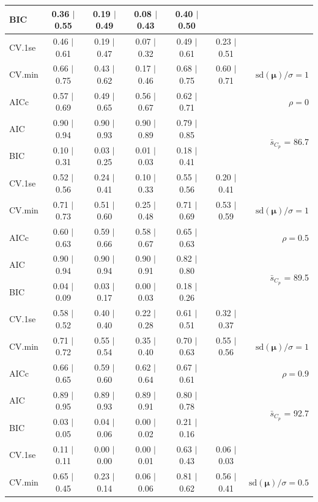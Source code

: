 \documentclass[12pt]{article}
\newcommand{\mr}[1]{\mathrm{#1}}
\newcommand{\bm}[1]{\mathbf{#1}}
\begin{document}
\begin{table}[p]
\begin{center}
\begin{tabular}{l*{5}{c}|r}
BIC & 0.36 $\mid$ 0.55 & 0.19 $\mid$ 0.49 & 0.08 $\mid$ 0.43 & 0.40 $\mid$ 0.50 & & \\
 \hline 
CV.1se & 0.46 $\mid$ 0.61 & 0.19 $\mid$ 0.47 & 0.07 $\mid$ 0.32 & 0.49 $\mid$ 0.61 & 0.23 $\mid$ 0.51 &\\
CV.min & 0.66 $\mid$ 0.75 & 0.43 $\mid$ 0.62 & 0.17 $\mid$ 0.46 & 0.68 $\mid$ 0.75 & 0.60 $\mid$ 0.71 &  $\mr{sd}(\bm{\mu})/\sigma=1$ \\
AICc & 0.57 $\mid$ 0.69 & 0.49 $\mid$ 0.65 & 0.56 $\mid$ 0.67 & 0.62 $\mid$ 0.71 & & $\rho=0$ \\
AIC & 0.90 $\mid$ 0.94 & 0.90 $\mid$ 0.93 & 0.90 $\mid$ 0.89 & 0.79 $\mid$ 0.85 & & \multirow{2}{*}{$\bar{s}_{C_p}$ = 86.7} \\
BIC & 0.10 $\mid$ 0.31 & 0.03 $\mid$ 0.25 & 0.01 $\mid$ 0.03 & 0.18 $\mid$ 0.41 & & \\
 \hline 
CV.1se & 0.52 $\mid$ 0.56 & 0.24 $\mid$ 0.41 & 0.10 $\mid$ 0.33 & 0.55 $\mid$ 0.56 & 0.20 $\mid$ 0.41 &\\
CV.min & 0.71 $\mid$ 0.73 & 0.51 $\mid$ 0.60 & 0.25 $\mid$ 0.48 & 0.71 $\mid$ 0.69 & 0.53 $\mid$ 0.59 &  $\mr{sd}(\bm{\mu})/\sigma=1$ \\
AICc & 0.60 $\mid$ 0.63 & 0.59 $\mid$ 0.66 & 0.58 $\mid$ 0.67 & 0.65 $\mid$ 0.63 & & $\rho=0.5$ \\
AIC & 0.90 $\mid$ 0.94 & 0.90 $\mid$ 0.94 & 0.90 $\mid$ 0.91 & 0.82 $\mid$ 0.80 & & \multirow{2}{*}{$\bar{s}_{C_p}$ = 89.5} \\
BIC & 0.04 $\mid$ 0.09 & 0.03 $\mid$ 0.17 & 0.00 $\mid$ 0.03 & 0.18 $\mid$ 0.26 & & \\
 \hline 
CV.1se & 0.58 $\mid$ 0.52 & 0.40 $\mid$ 0.40 & 0.22 $\mid$ 0.28 & 0.61 $\mid$ 0.51 & 0.32 $\mid$ 0.37 &\\
CV.min & 0.71 $\mid$ 0.72 & 0.55 $\mid$ 0.54 & 0.35 $\mid$ 0.40 & 0.70 $\mid$ 0.63 & 0.55 $\mid$ 0.56 &  $\mr{sd}(\bm{\mu})/\sigma=1$ \\
AICc & 0.66 $\mid$ 0.65 & 0.59 $\mid$ 0.60 & 0.62 $\mid$ 0.64 & 0.67 $\mid$ 0.61 & & $\rho=0.9$ \\
AIC & 0.89 $\mid$ 0.95 & 0.89 $\mid$ 0.93 & 0.89 $\mid$ 0.91 & 0.80 $\mid$ 0.78 & & \multirow{2}{*}{$\bar{s}_{C_p}$ = 92.7} \\
BIC & 0.03 $\mid$ 0.05 & 0.04 $\mid$ 0.06 & 0.00 $\mid$ 0.02 & 0.21 $\mid$ 0.16 & & \\
 \hline 
CV.1se & 0.11 $\mid$ 0.11 & 0.00 $\mid$ 0.00 & 0.00 $\mid$ 0.01 & 0.63 $\mid$ 0.43 & 0.06 $\mid$ 0.03 &\\
CV.min & 0.65 $\mid$ 0.45 & 0.23 $\mid$ 0.14 & 0.06 $\mid$ 0.06 & 0.81 $\mid$ 0.62 & 0.56 $\mid$ 0.41 &  $\mr{sd}(\bm{\mu})/\sigma=0.5$ \\

\end{tabular}
\end{center}
\end{table}
\end{document}
